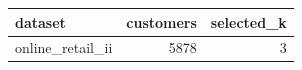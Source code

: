 \begin{tabular}{lrr}
\toprule
dataset & customers & selected_k \\
\midrule
online_retail_ii & 5878 & 3 \\
\bottomrule
\end{tabular}
